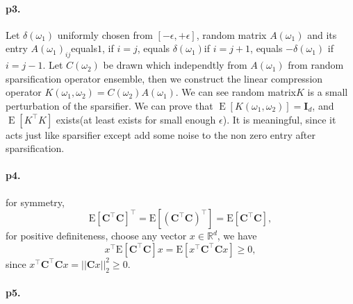 \documentclass[12pt,a4paper]{article}
\DeclareMathOperator{\E}{\mathrm{E}}
\begin{document}
	\paragraph{p3.}
	Let $\delta(\omega_1)$ uniformly chosen from $\left[-\epsilon,+\epsilon\right]$,  random matrix $A(\omega_1)$ and its entry $A(\omega_1)_{ij}$equals$1$, if $i=j$, equals $\delta(\omega_1)$if $i=j+1$, equals $-\delta(\omega_1)$ if $i=j-1$. Let $C(\omega_2)$ be drawn which independtly from $A(\omega_1)$ from random sparsification operator ensemble, then we construct the linear compression operator $K(\omega_1,\omega_2)=C(\omega_2)A(\omega_1)$. We can see random matrix$K$ is a small perturbation of  the sparsifier. We can prove that $\E\left[K(\omega_1,\omega_2)\right]=\boldsymbol{I}_d$, and $\E\left[K^{\top}K\right]$ exists(at least exists for small enough $\epsilon$). It is meaningful, since it acts just like sparsifier except add some noise to the non zero entry after sparsification. 
	
	
	
	\paragraph{p4.}
	for symmetry, 
	\begin{equation*}
		\mathrm{E}\left[\boldsymbol{C}^{\top} \boldsymbol{C}\right]^{\top}=\mathrm{E}\left[(\boldsymbol{C}^{\top} \boldsymbol{C})^{\top}\right]=\mathrm{E}\left[\boldsymbol{C}^{\top} \boldsymbol{C}\right],
	\end{equation*}
	for positive definiteness, choose any vector $x\in \mathbb{R}^d$, we have
	\begin{equation*}
		x^{\top}\mathrm{E}\left[\boldsymbol{C}^{\top} \boldsymbol{C}\right]x=\mathrm{E}\left[x^{\top}\boldsymbol{C}^{\top} \boldsymbol{C}x\right]\geq 0,
	\end{equation*}
	since $x^{\top}\boldsymbol{C}^{\top} \boldsymbol{C}x = ||\boldsymbol{C}x||_2^2\geq 0.$
	\paragraph{p5.}
	
\end{document}
